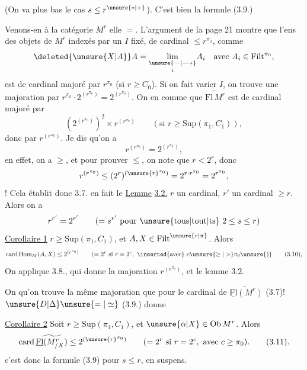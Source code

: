 (On va  plus bas le cas $s\le r^{\unsure{*|+}}$). C'est bien la formule (3.9.)

Venons-en à la catégorie $M^r$ elle $=$. L'argument de la page 21 montre que l'ens des  objets de $M^r$ indexés par un $I$ fixé, de cardinal $\le r^{\pi_0}$, comme
\[
\deleted{\unsure{X|A}}A=\underset{i}{\underset{\unsure{\mathrel{\text{---}}|\longrightarrow}}{\lim}}A_i
\quad\text{avec }A_i\in\mathrm{Filt}^{\pi_0},
\]
est de cardinal majoré par $r^{\pi_0}$ (si $r\ge C_0$). Si on fait varier $I$, on trouve  une majoration par $r^{\pi_0}\cdot2^{(r^{\pi_0})}=2^{(r^{\pi_0})}$.
On en  comme  que  $\widetilde{\mathrm{Fl}\,M^r}$ est de cardinal majoré par
\[
\left(2^{(r^{\pi_0})}\right)^2\times r^{(r^{\pi_0})}\qquad(\text{si }r\ge\mathrm{Sup}(\pi_1,C_1)),
\]
donc par $r^{(r^{\pi_0})}$. Je dis qu'on a
\[
r^{(r^{\pi_0})}=2^{(r^{\pi_0})},
\]
en effet, on a $\ge$, et pour prouver $\le$, on note que $r<2^r$, donc
\[
r^{(r^{\pi_0})}\le(2^r)^{(\unsure{r}^{\pi_0})}=2^{r\cdot r^{\pi_0}}=2^{r^{\pi_0}},
\]
 ! Cela établit donc 3.7.
 en fait le
\uline{Lemme} \uline{3.2.}  $r$ un cardinal, $r'$ un cardinal $\ge r$. Alors on a
\[
r^{r'}=2^{r'}\qquad(=s^{r'}\text{ pour \unsure{tous|tout|ts} }2\le s\le r)
\]
\uline{Corollaire 1}   $r\ge\mathrm{Sup}(\pi_1,C_1)$, et $A,X\in\mathrm{Filt}^{\unsure{r|\pi}}$. Alors
\[
\mathrm{card}\,\mathrm{Hom}_M(A,X)\le2^{(r^{\pi_0})}
\qquad(=2^r\text{ si }r=2^c,\ \inserted{\text{avec}}\ c\unsure{\ge|>}\pi_0\unsure{)}
\tag*{(3.10),}
\]
On applique 3.8.,  qui donne la majoration $r^{(r^{\pi_0})}$, et le lemme 3.2.

On  qu'on trouve la même majoration que pour le cardinal de $\widetilde{\underline{\mathrm{Fl}}(M^r)}$  (3.7)! $\unsure{D|\Delta}\unsure{=|\simeq}$ (3.9.) donne

\uline{Corollaire 2} Soit $r\ge\mathrm{Sup}(\pi_1,C_1)$, et $\unsure{\alpha|X}\in\mathrm{Ob}\,M^r$. Alors
\[
\mathrm{card}\,\widetilde{\underline{\mathrm{Fl}}(M^r_{/X})}\le2^{(\unsure{r}^{\pi_0})}
\qquad(=2^r\text{ si }r=2^c,\text{ avec }c\ge\pi_0).
\tag*{(3.11).}
\]
c'est donc la formule (3.9) pour $s\le r$,  en suspens.

